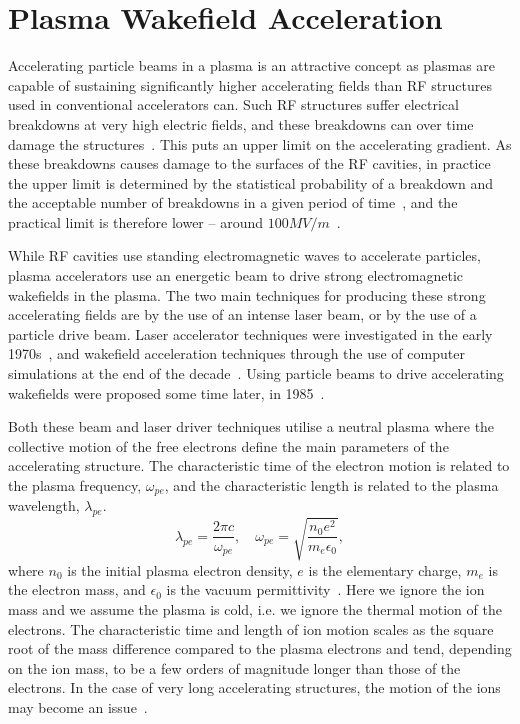 \section{Plasma Wakefield Acceleration}
\label{Int:PWFA}

Accelerating particle beams in a plasma is an attractive concept as plasmas are capable of sustaining significantly higher accelerating fields than RF structures used in conventional accelerators can.
Such RF structures suffer electrical breakdowns at very high electric fields, and these breakdowns can over time damage the structures~\cite{braun:2003}.
This puts an upper limit on the accelerating gradient.
As these breakdowns causes damage to the surfaces of the RF cavities, in practice the upper limit is determined by the statistical probability of a breakdown and the acceptable number of breakdowns in a given period of time~\cite{pritzkau:2002}, and the practical limit is therefore lower -- around $100\unit{MV/m}$~\cite{aicheler:2012}.

While RF cavities use standing electromagnetic waves to accelerate particles, plasma accelerators use an energetic beam to drive strong electromagnetic wakefields in the plasma.
The two main techniques for producing these strong accelerating fields are by the use of an intense laser beam, or by the use of a particle drive beam.
Laser accelerator techniques were investigated in the early 1970s~\cite{chan:1971, palmer:1972}, and wakefield acceleration techniques through the use of computer simulations at the end of the decade~\cite{tajima:1979}.
Using particle beams to drive accelerating wakefields were proposed some time later, in 1985~\cite{chen:1985}.

Both these beam and laser driver techniques utilise a neutral plasma where the collective motion of the free electrons define the main parameters of the accelerating structure.
The characteristic time of the electron motion is related to the plasma frequency, $\omega_{pe}$, and the characteristic length is related to the plasma wavelength, $\lambda_{pe}$.
\begin{equation}
    \lambda_{pe} = \frac{2\pi c}{\omega_{pe}}, \quad
    \omega_{pe}  = \sqrt{\frac{n_{0}e^{2}}{m_{e}\epsilon_{0}}}, \label{EQ:PWFA:L0W0}
\end{equation}
where $n_{0}$ is the initial plasma electron density, $e$ is the elementary charge, $m_{e}$ is the electron mass, and $\epsilon_{0}$ is the vacuum permittivity~\cite{tonks:1929, esarey:1996, pecseli:2012}.
Here we ignore the ion mass and we assume the plasma is cold, i.e. we ignore the thermal motion of the electrons.
The characteristic time and length of ion motion scales as the square root of the mass difference compared to the plasma electrons and tend, depending on the ion mass, to be a few orders of magnitude longer than those of the electrons.
In the case of very long accelerating structures, the motion of the ions may become an issue~\cite{rosenzweig:2005}.

